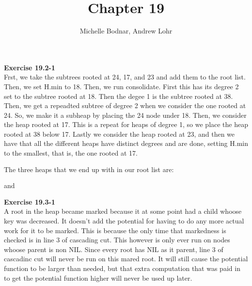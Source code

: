 \documentclass{article}
\title{Chapter 19}
\author{Michelle Bodnar, Andrew Lohr}
\begin{document}
\maketitle


\noindent\textbf{Exercise 19.2-1}\\
Frst, we take the subtrees rooted at 24, 17, and 23 and add them to the root list. Then, we set H.min to 18. Then, we run consolidate. First this has its degree 2 set to the subtree rooted at 18. Then the degee 1 is the subtree rooted at 38. Then, we get a repeadted subtree of degree 2 when we consider the one rooted at 24. So, we make it a subheap by placing the 24 node under 18. Then, we consider the heap rooted at 17. This is a repeat for heaps of degree 1, so we place the heap rooted at 38 below 17. Lastly we consider the heap rooted at 23, and then we have that all the different heaps have distinct degrees and are done, setting H.min to the smallest, that is, the one rooted at 17.

The three heaps that we end up with in our root list are:



and


\noindent\textbf{Exercise 19.3-1}\\
A root in the heap became marked because it at some point had a child whoose key was decreased. It doesn't add the potential for having to do any more actual work for it to be marked. This is because the only time that markedness is checked is in line 3 of cascading cut. This however is only ever run on nodes whoose parent is non NIL. Since every root has NIL as it parent, line 3 of cascadinc cut will never be run on this mared root. It will still cause the potential function to be larger than needed, but that extra computation that was paid in to get the potential function higher will never be used up later.\\
\end{document}
